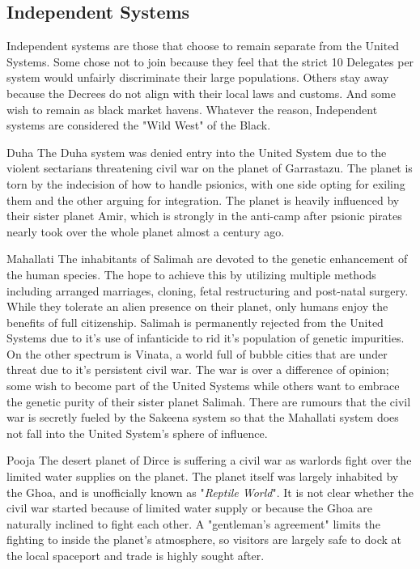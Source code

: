 \begin{multicols}{2}
  \subsection{Independent Systems}

  Independent systems are those that choose to remain separate from the United Systems. Some chose not to join because they feel that the strict 10 Delegates per system would unfairly discriminate their large populations. Others stay away because the Decrees do not align with their local laws and customs. And some wish to remain as black market havens. Whatever the reason, Independent systems are considered the "Wild West" of the Black.
  
  \begin{genericsection}{Duha}
  The Duha system was denied entry into the United System due to the violent sectarians threatening civil war on the planet of Garrastazu. The planet is torn by the indecision of how to handle psionics, with one side opting for exiling them and the other arguing for integration. The planet is heavily influenced by their sister planet Amir, which is strongly in the anti-camp after psionic pirates nearly took over the whole planet almost a century ago.
  \end{genericsection}
  
  \begin{genericsection}{Mahallati}
  The inhabitants of Salimah are devoted to the genetic enhancement of the human species. The hope to achieve this by utilizing multiple methods including arranged marriages, cloning, fetal restructuring and post-natal surgery. While they tolerate an alien presence on their planet, only humans enjoy the benefits of full citizenship. Salimah is permanently rejected from the United Systems due to it's use of infanticide to rid it's population of genetic impurities.\\
  On the other spectrum is Vinata, a world full of bubble cities that are under threat due to it's persistent civil war. The war is over a difference of opinion; some wish to become part of the United Systems while others want to embrace the genetic purity of their sister planet Salimah. There are rumours that the civil war is secretly fueled by the Sakeena system so that the Mahallati system does not fall into the United System's sphere of influence.
  \end{genericsection}
  
  \begin{genericsection}{Pooja}
  The desert planet of Dirce is suffering a civil war as warlords fight over the limited water supplies on the planet. The planet itself was largely inhabited by the Ghoa, and is unofficially known as "\textit{Reptile World}". It is not clear whether the civil war started because of limited water supply or because the Ghoa are naturally inclined to fight each other. A "gentleman's agreement" limits the fighting to inside the planet's atmosphere, so visitors are largely safe to dock at the local spaceport and trade is highly sought after.
  \end{genericsection}
  

\end{multicols}

